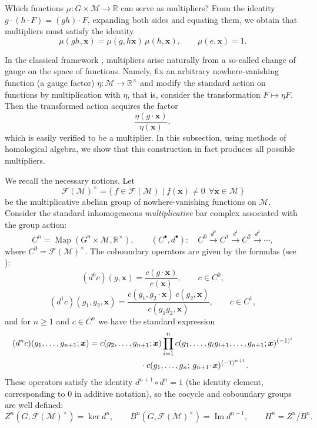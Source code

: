 \documentclass[12pt,reqno]{amsart}
\newcommand{\Map}{\operatorname{Map}}
\begin{document}
Which functions $\mu : G \times \mathcal M \to \mathbb{R}$ can serve as multipliers?
From the identity $g \cdot (h \cdot F) = (gh) \cdot F$, expanding both sides and equating them,
we obtain that multipliers must satisfy the identity
\begin{equation}\label{mult}
\mu(gh, \boldsymbol x) = \mu(g, h \boldsymbol x)\,\mu(h, \boldsymbol x), 
\qquad \mu(e,\boldsymbol x)=1.
\end{equation}

In the classical framework \cite{Olver1997}, multipliers arise naturally from a so-called
{change of gauge} on the space of functions.
Namely, fix an arbitrary nowhere-vanishing function (a gauge factor)
$\eta : \mathcal M \to \mathbb{R}^\times$ and modify the standard action on functions
by multiplication with $\eta$, that is, consider the transformation $F \mapsto \eta F$.
Then the transformed action acquires the factor
$$
\frac{\eta(g\!\cdot\!\boldsymbol x)}{\eta(\boldsymbol x)},
$$
which is easily verified to be a multiplier.
In this subsection, using methods of homological algebra, we show that this construction
in fact produces {all} possible multipliers.

\medskip

We recall the necessary notions.
Let
$$
\mathcal F(\mathcal M)^\times
=
\{\,f\in\mathcal F(\mathcal M)\mid f(\boldsymbol x)\neq 0\ \ \forall \boldsymbol x\in\mathcal M\,\}
$$
be the multiplicative abelian group of nowhere-vanishing functions on $\mathcal M$.
Consider the standard inhomogeneous \emph{multiplicative} bar complex associated with the group action:
$$
C^n = \Map(G^n \times \mathcal M,\mathbb{R}^\times),\qquad
(C^\bullet,d^\bullet):\quad
C^0 \xrightarrow{\,d^0\,} C^1 \xrightarrow{\,d^1\,} C^2 \xrightarrow{\,d^2\,}\cdots,
$$
where $C^0=\mathcal F(\mathcal M)^\times$.
The coboundary operators are given by the formulas (see \cite{Braun}):
$$
(d^0 c)(g,\boldsymbol x)
=
\frac{c(g\!\cdot\!\boldsymbol x)}{c(\boldsymbol x)},
\qquad c\in C^0,
$$
$$
(d^1 c)(g_1,g_2,\boldsymbol x)
=
\frac{c(g_1,g_2\!\cdot\!\boldsymbol x)\,c(g_2,\boldsymbol x)}
{c(g_1 g_2,\boldsymbol x)},
\qquad c\in C^1,
$$
and for $n\ge 1$ and $c\in C^n$ we have the standard expression
$$
\begin{aligned}
(d^n c)(g_1,\dots,g_{n+1};\boldsymbol x)
&=
c(g_2,\dots,g_{n+1};\boldsymbol x)
\prod_{i=1}^{n}
c(g_1,\dots,g_i g_{i+1},\dots,g_{n+1};\boldsymbol x)^{(-1)^i} \\
&\hspace{2.2cm}\cdot
c(g_1,\dots,g_n;\,g_{n+1}\!\cdot\!\boldsymbol x)^{(-1)^{n+1}}.
\end{aligned}
$$
These operators satisfy the identity $d^{n+1}\circ d^n = 1$
(the identity element, corresponding to $0$ in additive notation),
so the cocycle and coboundary groups are well defined:
$$
Z^n(G,\mathcal F(\mathcal M)^\times)=\ker d^n,
\qquad
B^n(G,\mathcal F(\mathcal M)^\times)=\operatorname{Im} d^{n-1},
\qquad
H^n = Z^n/B^n.
$$
\end{document}
